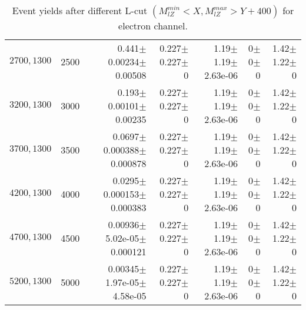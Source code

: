 \documentclass[]{article}
\begin{document}
\begin{table}
\begin{center}
{\begin{tabular}{ |r|r|r|r|r|r|r|}
$2700,1300$ & 2500 & 0.441$\pm$0.00234$\pm$0.00508 & 0.227$\pm$0.227$\pm$0 & 1.19$\pm$1.19$\pm$2.63e-06 & 0$\pm$0$\pm$0 & 1.42$\pm$1.22$\pm$0 \\
$3200,1300$ & 3000 & 0.193$\pm$0.00101$\pm$0.00235 & 0.227$\pm$0.227$\pm$0 & 1.19$\pm$1.19$\pm$2.63e-06 & 0$\pm$0$\pm$0 & 1.42$\pm$1.22$\pm$0 \\
$3700,1300$ & 3500 & 0.0697$\pm$0.000388$\pm$0.000878 & 0.227$\pm$0.227$\pm$0 & 1.19$\pm$1.19$\pm$2.63e-06 & 0$\pm$0$\pm$0 & 1.42$\pm$1.22$\pm$0 \\
$4200,1300$ & 4000 & 0.0295$\pm$0.000153$\pm$0.000383 & 0.227$\pm$0.227$\pm$0 & 1.19$\pm$1.19$\pm$2.63e-06 & 0$\pm$0$\pm$0 & 1.42$\pm$1.22$\pm$0 \\
$4700,1300$ & 4500 & 0.00936$\pm$5.02e-05$\pm$0.000121 & 0.227$\pm$0.227$\pm$0 & 1.19$\pm$1.19$\pm$2.63e-06 & 0$\pm$0$\pm$0 & 1.42$\pm$1.22$\pm$0 \\
$5200,1300$ & 5000 & 0.00345$\pm$1.97e-05$\pm$4.58e-05 & 0.227$\pm$0.227$\pm$0 & 1.19$\pm$1.19$\pm$2.63e-06 & 0$\pm$0$\pm$0 & 1.42$\pm$1.22$\pm$0 \\
\hline 
\end{tabular}
}
\end{center}
\caption{Event yields after different L-cut $(M_{lZ}^{min} < X, M_{lZ}^{max} > Y + 400)$ for electron channel.}
\end{table}
\end{document}

